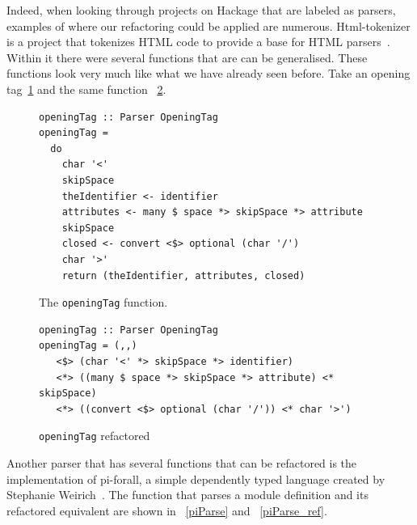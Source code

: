 Indeed, when looking through projects on Hackage that are labeled as parsers, examples of where our refactoring could be applied are numerous. Html-tokenizer is a project that tokenizes HTML code to provide a base for HTML parsers~\DIFdelbegin {}\DIFdelend \DIFaddbegin {}\DIFaddend . Within it there were several functions that are can be generalised. These functions look very much like what we have already seen before. Take \DIFdelbegin {}\DIFdelend \DIFaddbegin {}\DIFaddend an opening tag\DIFdelbegin {}\DIFdelend \DIFaddbegin {}\DIFaddend ~\ref{openingTag} and the same function \DIFdelbegin {}\DIFdelend \DIFaddbegin {}\DIFaddend ~\ref{openingTag_ref}.

\begin{figure}[t]
\begin{lstlisting}
openingTag :: Parser OpeningTag
openingTag =
  do
    char '<'
    skipSpace
    theIdentifier <- identifier
    attributes <- many $ space *> skipSpace *> attribute
    skipSpace
    closed <- convert <$> optional (char '/')
    char '>'
    return (theIdentifier, attributes, closed)
\end{lstlisting}
\caption{The \texttt{openingTag} function.}
\label{openingTag}
\end{figure}

\begin{figure}[t]
\begin{lstlisting}
openingTag :: Parser OpeningTag
openingTag = (,,) 
   <$> (char '<' *> skipSpace *> identifier) 
   <*> ((many $ space *> skipSpace *> attribute) <* skipSpace) 
   <*> ((convert <$> optional (char '/')) <* char '>')
\end{lstlisting}
\caption{\texttt{openingTag} refactored}
\label{openingTag_ref}
\end{figure}

Another parser that has several functions that can be refactored is \DIFdelbegin {}\DIFdelend the implementation of pi-forall, a simple dependently typed language created by Stephanie Weirich~\DIFdelbegin {}\DIFdelend \DIFaddbegin {}\DIFaddend . The function that parses a module definition and its refactored equivalent are shown in \DIFdelbegin {}\DIFdelend \DIFaddbegin {}\DIFaddend ~\ref{piParse} and ~\ref{piParse_ref}.

